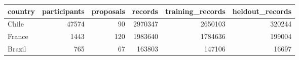 \begin{tabular}{lrrrrr}
\toprule
country & participants & proposals & records & training_records & heldout_records \\
\midrule
Chile & 47574 & 90 & 2970347 & 2650103 & 320244 \\
France & 1443 & 120 & 1983640 & 1784636 & 199004 \\
Brazil & 765 & 67 & 163803 & 147106 & 16697 \\
\bottomrule
\end{tabular}
